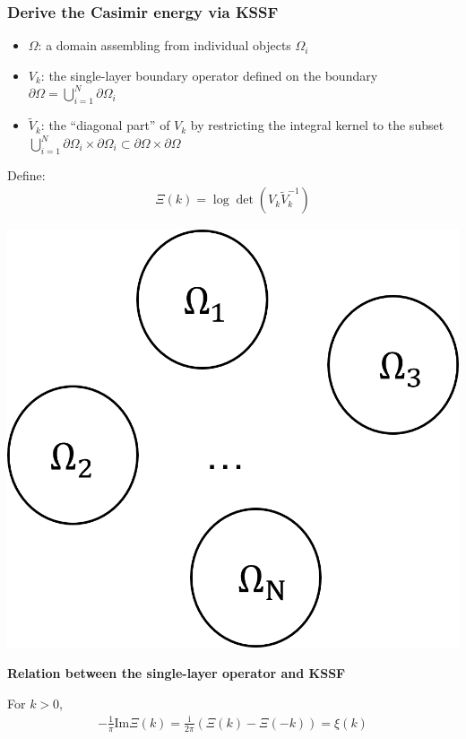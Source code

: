 \documentclass[dvipsnames,10pt]{beamer}
\begin{document}
\begin{frame}
    \frametitle{Derive the Casimir energy via KSSF}
    \vspace{0.3cm}
    \begin{itemize}
        \item $\Omega$: a domain assembling from individual objects $\Omega_{i}$
        \item $V_{k}$: the single-layer boundary operator defined on the boundary 
    $\partial\Omega = \bigcup_{i = 1}^{N}\partial\Omega_{i}$
    \item $\tilde{V}_{k}$: the ``diagonal part'' of $V_{k}$ by restricting the integral 
    kernel to the subset $\bigcup_{i = 1}^{N}\partial\Omega_{i}\times\partial\Omega_{i}\subset\partial\Omega\times\partial\Omega$ 
    \end{itemize}
    \begin{minipage}{5cm}
    Define:
    \begin{align*}
        \Xi(k) = \log\det\left(V_{k}\tilde{V}_{k}^{-1}\right)
    \end{align*}
    \end{minipage}
    \begin{minipage}{2cm}
        \includegraphics[scale = 0.5]{figs/Domain.png}
    \end{minipage}
    \begin{tcolorbox}
    \textbf{Relation between the single-layer operator and KSSF}
    
        For $k>0$,
        \begin{align*}
        -\frac{1}{\pi}\text{Im}\Xi(k) = \frac{\mathrm{i}}{2\pi}(\Xi(k) - \Xi(-k)) = \xi(k)
    \end{align*}
    \end{tcolorbox}
\end{frame}
\end{document}
